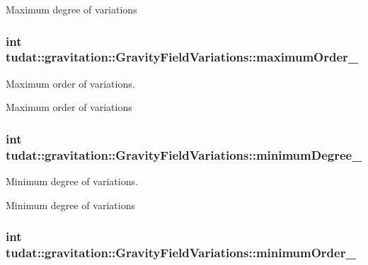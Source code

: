 Maximum degree of variations 
\subsubsection[{\texorpdfstring{maximum\+Order\+\_\+}{maximumOrder_}}]{\setlength{\rightskip}{0pt plus 5cm}int tudat\+::gravitation\+::\+Gravity\+Field\+Variations\+::maximum\+Order\+\_\+\hspace{0.3cm}{\ttfamily [protected]}}\hypertarget{classtudat_1_1gravitation_1_1GravityFieldVariations_ab5d6f1bd7478e0a44dd6145cfa834242}{}\label{classtudat_1_1gravitation_1_1GravityFieldVariations_ab5d6f1bd7478e0a44dd6145cfa834242}


Maximum order of variations. 

Maximum order of variations 
\subsubsection[{\texorpdfstring{minimum\+Degree\+\_\+}{minimumDegree_}}]{\setlength{\rightskip}{0pt plus 5cm}int tudat\+::gravitation\+::\+Gravity\+Field\+Variations\+::minimum\+Degree\+\_\+\hspace{0.3cm}{\ttfamily [protected]}}\hypertarget{classtudat_1_1gravitation_1_1GravityFieldVariations_a9bf8b72830d19d382bcdc935cd69c69e}{}\label{classtudat_1_1gravitation_1_1GravityFieldVariations_a9bf8b72830d19d382bcdc935cd69c69e}


Minimum degree of variations. 

Minimum degree of variations 
\subsubsection[{\texorpdfstring{minimum\+Order\+\_\+}{minimumOrder_}}]{\setlength{\rightskip}{0pt plus 5cm}int tudat\+::gravitation\+::\+Gravity\+Field\+Variations\+::minimum\+Order\+\_\+\hspace{0.3cm}{\ttfamily [protected]}}\hypertarget{classtudat_1_1gravitation_1_1GravityFieldVariations_a6f6ab951e6a5ec1ca230d629ae2a1104}{}\label{classtudat_1_1gravitation_1_1GravityFieldVariations_a6f6ab951e6a5ec1ca230d629ae2a1104}


